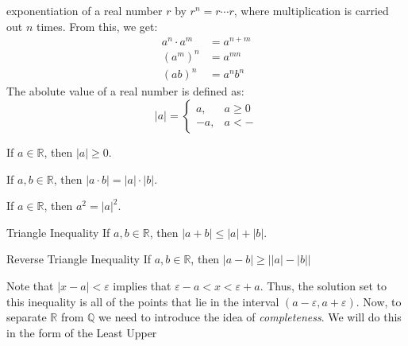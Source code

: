 \documentclass[crop=false,class=book,oneside]{standalone}
\begin{document}
            exponentiation of a real number $r$ by
            $r^{n}=r\cdots{r}$, where multiplication is
            carried out $n$ times. From this, we get:
            \begin{subequations}
                \begin{align}
                    a^{n}\cdot{a}^{m}&=a^{n+m}\\
                    (a^{m})^{n}&=a^{mn}\\
                    (ab)^{n}&=a^{n}b^{n}
                \end{align}
            \end{subequations}
            The abolute value of a real number is defined as:
            \begin{equation}
                |a|=
                \begin{cases}
                    a,&a\geq{0}\\
                    \minus{a},&a<-
                \end{cases}
            \end{equation}
            \begin{theorem}
                If $a\in\mathbb{R}$, then $|a|\geq{0}$.
            \end{theorem}
            \begin{theorem}
                If $a,b\in\mathbb{R}$, then
                $|a\cdot{b}|=|a|\cdot|b|$.
            \end{theorem}
            \begin{theorem}
                If $a\in\mathbb{R}$, then $a^{2}=|a|^{2}$.
            \end{theorem}
            \begin{ltheorem}{Triangle Inequality}
                If $a,b\in\mathbb{R}$, then
                $|a+b|\leq|a|+|b|$.
            \end{ltheorem}
            \begin{ltheorem}{Reverse Triangle Inequality}
                If $a,b\in\mathbb{R}$, then
                $|a-b|\geq\big||a|-|b|\big|$
            \end{ltheorem}
            Note that $|x-a|<\varepsilon$ implies that
            $\varepsilon-a<x<\varepsilon+a$. Thus, the solution set
            to this inequality is all of the points that lie in the
            interval $(a-\varepsilon,a+\varepsilon)$. Now, to
            separate $\mathbb{R}$ from $\mathbb{Q}$ we need
            to introduce the idea of \textit{completeness}.
            We will do this in the form of the Least Upper
\end{document}
